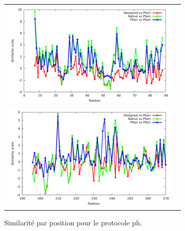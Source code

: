 \documentclass[a4paper,12pt]{article}
\begin{document}
\begin{figure}[t]
\begin{tabular}{cc}
       \includegraphics[width=8.45cm]{images/1O4C_ph_similarity_bypos.pdf} \\
       \includegraphics[width=8.45cm]{images/1R6J_ph_similarity_bypos.pdf} \\
     \end{tabular}
     
     \caption{Similarité par position pour le protocole ph.}
     \label{Sim_pos_byph}
   \end{figure}
\end{document}
